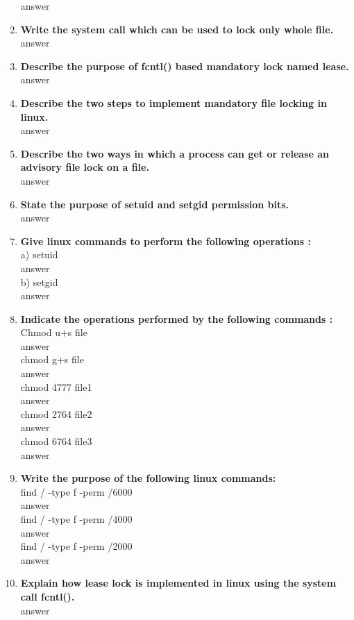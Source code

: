 \documentclass[a4paper,12pt]{article}
\begin{document}
\begin{flushleft}
\begin{enumerate}
{\color{red}answer}\\
\item \textbf{  Write the system call which can be used to lock only whole file.}\\
{\color{red}answer}\\
\item \textbf{  Describe the purpose of fcntl() based mandatory lock named lease.}\\
{\color{red}answer}\\
\item \textbf{  Describe the two steps to implement mandatory file locking in linux.}\\
{\color{red}answer}\\
\item \textbf{  Describe the two ways in which a process can get or release an advisory file lock on a file.}\\
{\color{red}answer}\\
\item \textbf{  State the purpose of setuid and setgid permission bits.}\\
{\color{red}answer}\\
\item \textbf{  Give linux commands to perform the following operations :}\\
a) setuid\\{\color{red}answer}\\
 b) setgid\\{\color{red}answer}\\
\item \textbf{  Indicate the operations performed by the following commands :}\\
Chmod u+s file\\{\color{red}answer}\\
chmod g+s file\\{\color{red}answer}\\
chmod 4777 file1\\{\color{red}answer}\\
chmod 2764 file2\\{\color{red}answer}\\
chmod 6764 file3\\{\color{red}answer}\\
\item \textbf{  Write the purpose of the following linux commands:}\\
find / -type f -perm /6000\\{\color{red}answer}\\
find / -type f -perm /4000\\{\color{red}answer}\\
find / -type f -perm /2000\\{\color{red}answer}\\
\item \textbf{  Explain how lease lock is implemented in linux using the system call fcntl().}\\
{\color{red}answer}\\
\end{enumerate}


\end{flushleft}
\end{document}
